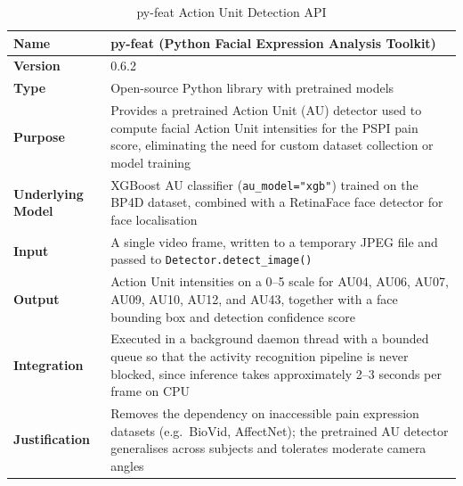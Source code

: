 \begin{table}[htbp]
\centering
\caption{py-feat Action Unit Detection API}
\renewcommand{\arraystretch}{1.3}
\begin{tabular}{|p{3.5cm}|p{10cm}|}
\hline
\textbf{Name} & py-feat (Python Facial Expression Analysis Toolkit) \\ \hline
\textbf{Version} & 0.6.2 \\ \hline
\textbf{Type} & Open-source Python library with pretrained models \\ \hline
\textbf{Purpose} & Provides a pretrained Action Unit (AU) detector used to compute facial Action Unit intensities for the PSPI pain score, eliminating the need for custom dataset collection or model training \\ \hline
\textbf{Underlying Model} & XGBoost AU classifier (\texttt{au\_model="xgb"}) trained on the BP4D dataset, combined with a RetinaFace face detector for face localisation \\ \hline
\textbf{Input} & A single video frame, written to a temporary JPEG file and passed to \texttt{Detector.detect\_image()} \\ \hline
\textbf{Output} & Action Unit intensities on a 0--5 scale for AU04, AU06, AU07, AU09, AU10, AU12, and AU43, together with a face bounding box and detection confidence score \\ \hline
\textbf{Integration} & Executed in a background daemon thread with a bounded queue so that the activity recognition pipeline is never blocked, since inference takes approximately 2--3 seconds per frame on CPU \\ \hline
\textbf{Justification} & Removes the dependency on inaccessible pain expression datasets (e.g.\ BioVid, AffectNet); the pretrained AU detector generalises across subjects and tolerates moderate camera angles \\ \hline
\end{tabular}
\end{table}
